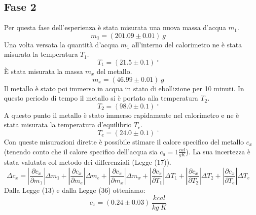 \subsection{Fase 2}
Per questa fase dell'esperienza è stata misurata una nuova massa d'acqua $m_1$.
\begin{equation}
	m_1=(201.09\pm 0.01)\ g
\end{equation}
Una volta versata la quantità d'acqua $m_1$ all'interno del calorimetro ne è stata misurata la temperatura $T_1$.
\begin{equation}
	T_1=(21.5\pm 0.1)\ ^{\circ}
\end{equation}
È stata misurata la massa $m_x$ del metallo.
\begin{equation}
	m_x=(46.99\pm 0.01)\ g
\end{equation}
Il metallo è stato poi immerso in acqua in stato di ebollizione per 10 minuti. In questo periodo di tempo il metallo si è portato alla temperatura $T_2$.
\begin{equation}
	T_2=(98.0\pm 0.1)\ ^{\circ}
\end{equation}
A questo punto il metallo è stato immerso rapidamente nel calorimetro e ne è stata misurata la temperatura d'equilibrio $T_e$.
\begin{equation}
	T_e=(24.0\pm 0.1)\ ^{\circ}
\end{equation}
Con queste misurazioni dirette è possibile stimare il calore specifico del metallo $c_x$ (tenendo conto che il calore specifico dell'acqua sia $c_a=1\frac{cal}{gK}$). La sua incertezza è stata valutata col metodo dei differenziali (Legge (17)).
\begin{equation}
	\Delta c_x=\left|\frac{\partial c_x}{\partial m_1} \right|\Delta m_1 + \left|\frac{\partial c_x}{\partial m_e} \right|\Delta m_e + \left|\frac{\partial c_x}{\partial m_x} \right|\Delta m_x + \left|\frac{\partial c_x}{\partial T_1} \right|\Delta T_1 + \left|\frac{\partial c_x}{\partial T_2} \right|\Delta T_2 + \left|\frac{\partial c_x}{\partial T_e} \right|\Delta T_e
\end{equation}
Dalla Legge (13) e dalla Legge (36) otteniamo:
\begin{equation}
	c_x=(0.24\pm 0.03)\ \frac{kcal}{kg\ K}
\end{equation}






